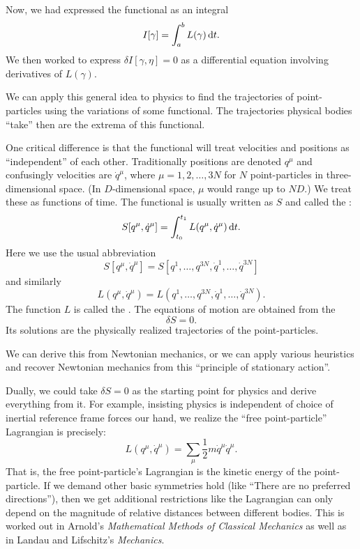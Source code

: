 Now, we had expressed the functional as an integral
\begin{equation}
I[\gamma] = \int^{b}_{a}L(\gamma)\,\mathrm{d} t.
\end{equation}
We then worked to express $\delta I[\gamma,\eta]=0$ as a differential
equation involving derivatives of $L(\gamma)$.

We can apply this general idea to physics to find the trajectories of
point-particles using the variations of some functional. The
trajectories physical bodies ``take'' then are the extrema of this
functional.

One critical difference is that the functional will treat velocities and
positions as ``independent'' of each other. Traditionally positions are
denoted $q^{\mu}$ and confusingly velocities are $\dot{q}^{\mu}$, where
$\mu=1,2,\dots,3N$ for $N$ point-particles in three-dimensional
space. (In $D$-dimensional space, $\mu$ would range up to $ND$.) We
treat these as functions of time. The
functional is usually written as $S$ and called the :
\begin{equation}
S[q^{\mu},\dot{q}^{\mu}] =
\int^{t_{1}}_{t_{0}}L(q^{\mu},\dot{q}^{\mu})\,\mathrm{d} t.
\end{equation}
Here we use the usual abbreviation
$$S[q^{\mu},\dot{q}^{\mu}] = S[q^{1},\dots,q^{3N},\dot{q}^{1},\dots,\dot{q}^{3N}]$$
and similarly
$$L(q^{\mu},\dot{q}^{\mu}) = L(q^{1},\dots,q^{3N},\dot{q}^{1},\dots,\dot{q}^{3N}).$$
The function $L$ is called the . The equations of
motion are obtained from the 
\begin{equation}
\delta S = 0.
\end{equation}
Its solutions are the physically realized trajectories of the point-particles.

We can derive this from Newtonian mechanics, or we can apply various
heuristics and recover Newtonian mechanics from this ``principle of
stationary action''.

\M
Dually, we could take $\delta S=0$ as the starting point for physics and
derive everything from it. For example, insisting physics is independent
of choice of inertial reference frame forces our hand, we realize the
``free point-particle'' Lagrangian is precisely:
\begin{equation}
L(q^{\mu},\dot{q}^{\mu}) = \sum_{\mu}\frac{1}{2}m\dot{q}^{\mu}\dot{q}^{\mu}.
\end{equation}
That is, the free point-particle's Lagrangian is the kinetic energy of
the point-particle. If we demand other basic symmetries hold (like
``There are no preferred directions''), then we get additional
restrictions like the Lagrangian can only depend on the magnitude of
relative distances between different bodies. This is worked out in
Arnold's \textit{Mathematical Methods of Classical Mechanics} as well as
in Landau and Lifschitz's \textit{Mechanics}.

